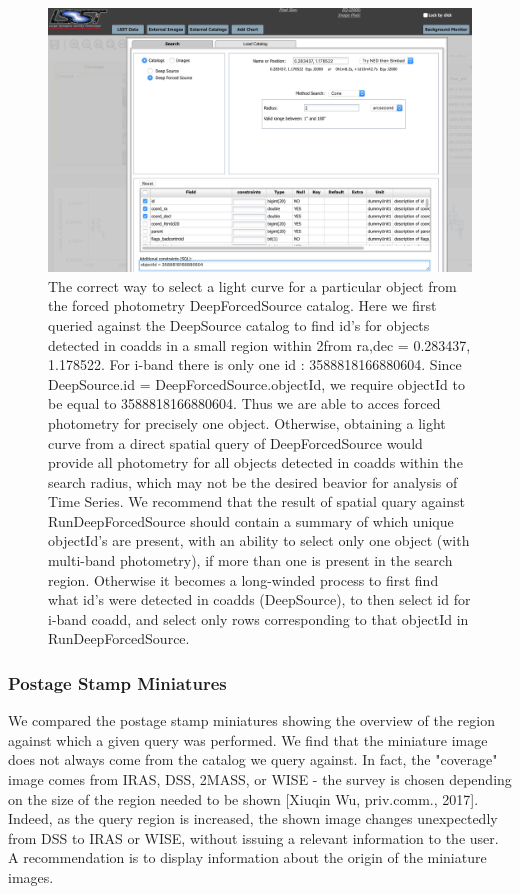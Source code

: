 \documentclass[DM,lsstdraft,toc,usenatbib]{lsstdoc}
\begin{document}
\begin{figure}
\includegraphics[width=\textwidth]{figs/4_PDAC_cone_DeepForcedSource}
\caption{The correct way to select a light curve for a  particular object from the forced photometry DeepForcedSource catalog.  Here we first queried against the DeepSource catalog to find  id's for objects detected in coadds in a small region within 2\arcsec from ra,dec =  0.283437\degree, 1.178522\degree. For i-band there is only one id :  3588818166880604. Since DeepSource.id =  DeepForcedSource.objectId,  we require objectId to be equal to  3588818166880604. Thus we are able to acces forced photometry for precisely one object.  Otherwise, obtaining a light curve from a direct spatial  query of DeepForcedSource would provide all photometry for all objects detected in coadds within the search radius, which may not be the desired beavior for analysis of Time Series. We recommend that the result of spatial quary against RunDeepForcedSource should contain a summary of which unique objectId's are present,  with an ability to select only one object (with multi-band photometry), if more than one is present in the search region. Otherwise it becomes a long-winded process to first find what id's were detected in coadds (DeepSource), to then select id for i-band coadd, and select only rows corresponding to that objectId in RunDeepForcedSource.}
\label{fig:PDAC_cone_DFS}
\end{figure}

\subsubsection{Postage Stamp Miniatures }
\label{sec:miniatures}


We compared the postage stamp miniatures showing the overview of the region against which a given query was performed. We find that the miniature image does not always come from the catalog we query against.  In fact, the "coverage" image comes from IRAS, DSS, 2MASS, or WISE -  the survey is chosen depending on the size of the region needed to be shown [Xiuqin Wu, priv.comm., 2017].  Indeed, as the query region is increased,  the shown image changes unexpectedly from DSS to IRAS or WISE, without issuing a relevant information to the user.  A recommendation is to display information about the origin of the miniature images. 
\end{document}
